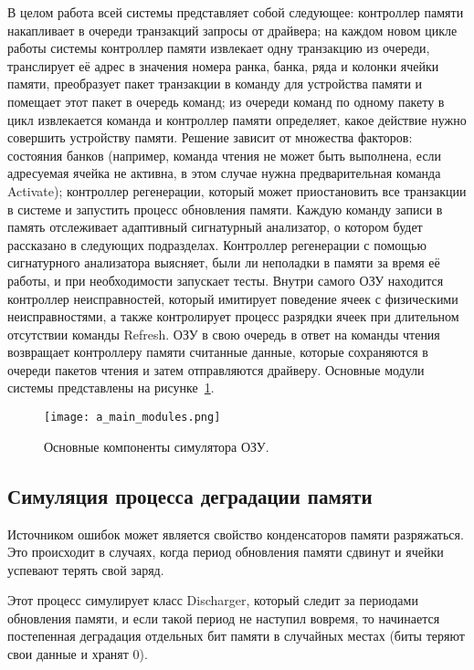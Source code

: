 В целом работа всей системы представляет собой следующее: контроллер памяти накапливает в очереди транзакций запросы от драйвера; на каждом новом цикле работы системы контроллер памяти извлекает одну транзакцию из очереди, транслирует её адрес в значения номера ранка, банка, ряда и колонки ячейки памяти, преобразует пакет транзакции в команду для устройства памяти и помещает этот пакет в очередь команд; из очереди команд по одному пакету в цикл извлекается команда и контроллер памяти определяет, какое действие нужно совершить устройству памяти. Решение  зависит от множества факторов: состояния банков (например, команда чтения не может быть выполнена, если адресуемая ячейка не активна, в этом случае нужна предварительная команда Activate); контроллер регенерации, который может приостановить все транзакции в системе и запустить процесс обновления памяти. Каждую команду записи в память отслеживает адаптивный сигнатурный анализатор, о котором будет рассказано в следующих подразделах. Контроллер регенерации с помощью сигнатурного анализатора выясняет, были ли неполадки в памяти за время её работы, и при необходимости запускает тесты. Внутри самого ОЗУ находится контроллер неисправностей, который имитирует поведение ячеек с физическими неисправностями, а также контролирует процесс разрядки ячеек при длительном отсутствии команды Refresh. ОЗУ в свою очередь в ответ на команды чтения возвращает контроллеру памяти считанные данные, которые сохраняются в очереди пакетов чтения и затем отправляются драйверу. Основные модули системы представлены на рисунке~\ref{fig:arch_and_mod:modules:main_modules}.

\begin{figure}[ht]
\centering
  \texttt{[image: a\_main\_modules.png]}  
  \caption{ Основные компоненты симулятора ОЗУ. }
  \label{fig:arch_and_mod:modules:main_modules}
\end{figure}

\subsection{Симуляция процесса деградации памяти}
\label{sub:arch_and_mod:memory_discharge}

Источником ошибок может является свойство конденсаторов памяти разряжаться. Это происходит в случаях, когда период обновления памяти сдвинут и ячейки успевают терять свой заряд.

Этот процесс симулирует класс Discharger, который следит за периодами обновления памяти, и если такой период не наступил вовремя, то начинается постепенная деградация отдельных бит памяти в случайных местах (биты теряют свои данные и хранят 0). 

